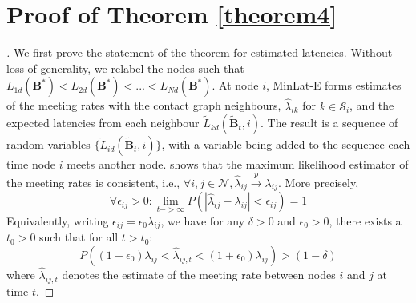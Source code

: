\documentclass[journal,onecolumn,11pt]{IEEEtran}
\theoremstyle{plain}
\theoremstyle{definition}
\begin{document}
\section{Proof of Theorem \ref{theorem4}}\label{pt4}
\begin{proof}[\unskip\nopunct]
  We first prove the statement of the theorem for estimated latencies.
  Without loss of generality, we relabel the nodes such that
  $L_{1d}(\mathbf{B}^*)<L_{2d}(\mathbf{B}^*)<...<L_{Nd}(\mathbf{B}^*)$. At
  node $i$, MinLat-E forms estimates of the meeting rates with the
  contact graph neighbours, $\widehat{\lambda}_{ik}$ for $k \in
  \mathcal{S}_i$, and the expected latencies from each neighbour
  $\widetilde{L}_{kd}(\widetilde{\mathbf{B}}_t,i)$. The result is a sequence of random
  variables $\{\widetilde{L}_{id}(\widetilde{\mathbf{B}}_t,i)\}$, with a variable being added
  to the sequence each time node $i$ meets another
  node. \cite{berk1972consistency} shows that the maximum likelihood
  estimator of the meeting rates is consistent, i.e., $\forall
  i,j\in\mathcal{N},\widehat{\lambda}_{ij} \xrightarrow{p}
  \lambda_{ij}$. More precisely,
\begin{equation}\label{consistency}
\forall \epsilon_{ij}>0 : \underset{t -> \infty}{\lim} P(|\hat{\lambda}_{ij}-\lambda_{ij}|< \epsilon_{ij})=1
\end{equation}
Equivalently, writing $\epsilon_{ij}=\epsilon_0 \lambda_{ij}$, we have
for any $\delta > 0$ and $\epsilon_{0}>0$, there exists a $t_0 >0$ such that for all $t>t_0$:
\begin{equation}
P((1-\epsilon_0)\lambda_{ij}<\widehat{\lambda}_{ij,t}<
(1+\epsilon_0)\lambda_{ij}) > (1-\delta) \label{prob_bound}
\end{equation}
where $\widehat{\lambda}_{ij,t}$ denotes the estimate of the meeting
rate between nodes $i$ and $j$ at time $t$.


\end{proof}
\end{document}
